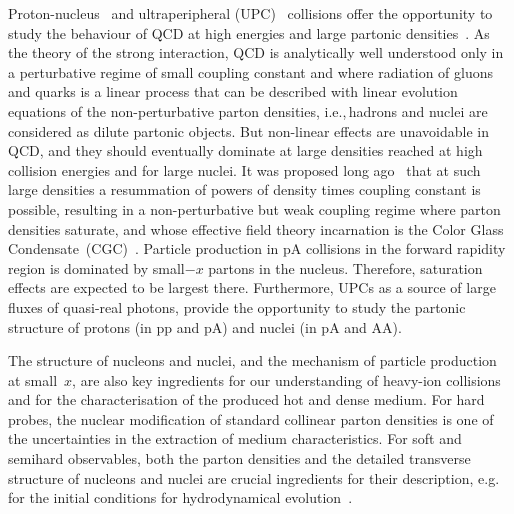\documentclass[../report.tex]{subfiles}
\begin{document}
Proton-nucleus~\cite{Salgado:2011wc} and ultraperipheral (UPC)~\cite{Baltz:2007kq} collisions offer the opportunity to study the behaviour of QCD at high energies and large partonic densities~\cite{Kovchegov:2012mbw}. 
As the theory of the strong interaction, QCD is analytically well understood only in a perturbative regime of small coupling constant and where radiation of gluons and quarks is a linear process that can 
be described with linear evolution equations of the non-perturbative 
parton densities, i.e.,\,hadrons and nuclei are considered as dilute partonic objects. 
But non-linear effects are unavoidable in QCD, and they should eventually dominate at large densities reached at high collision energies and for large nuclei.  
It was proposed long ago~\cite{Gribov:1984tu,Mueller:1985wy} that at such large densities a resummation of powers of density times coupling constant is possible, resulting in a non-perturbative but weak coupling regime where parton densities saturate, and whose effective field theory incarnation is the Color Glass Condensate~(CGC)~\cite{Gelis:2010nm}.
Particle production in pA collisions in the forward rapidity region is dominated by small$-x$ partons in the nucleus. 
Therefore, saturation effects are expected to be largest there. Furthermore, UPCs as a source of large fluxes of quasi-real photons, provide the opportunity to study the partonic structure of protons (in pp and pA) and nuclei (in pA and AA).



The structure of nucleons and nuclei, and the mechanism of particle production at small~$x$, are also key ingredients for our understanding of heavy-ion collisions and for the characterisation of the produced hot and dense medium. 
For hard probes, the nuclear modification of standard collinear parton densities is one of the uncertainties in the extraction of medium characteristics. 
For soft and semihard observables, both the parton densities and the detailed transverse structure of nucleons and nuclei are crucial ingredients for their description, e.g.\,for the initial conditions for hydrodynamical evolution~\cite{Liu:2015nwa,Weller:2017tsr,Mantysaari:2017cni}.
\end{document}
